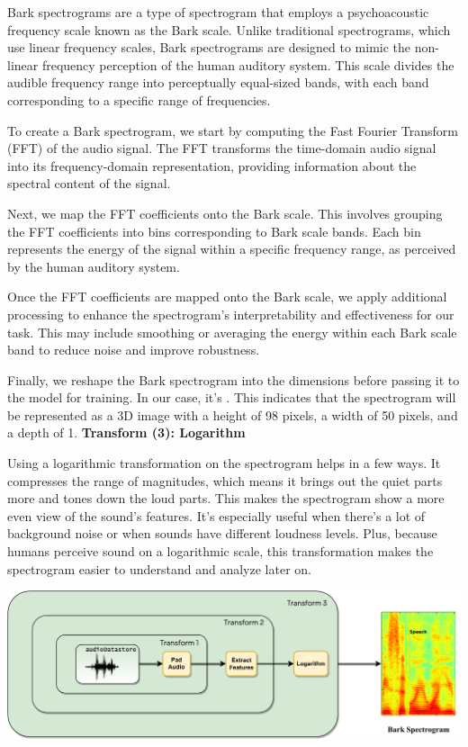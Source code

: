 \documentclass[a4paper]{report}
\begin{document}
{Bark spectrograms are a type of spectrogram that employs a psychoacoustic frequency scale known as the Bark scale. Unlike traditional spectrograms, which use linear frequency scales, Bark spectrograms are designed to mimic the non-linear frequency perception of the human auditory system. This scale divides the audible frequency range into perceptually equal-sized bands, with each band corresponding to a specific range of frequencies.

To create a Bark spectrogram, we start by computing the Fast Fourier Transform (FFT) of the audio signal. The FFT transforms the time-domain audio signal into its frequency-domain representation, providing information about the spectral content of the signal.

Next, we map the FFT coefficients onto the Bark scale. This involves grouping the FFT coefficients into bins corresponding to Bark scale bands. Each bin represents the energy of the signal within a specific frequency range, as perceived by the human auditory system.

Once the FFT coefficients are mapped onto the Bark scale, we apply additional processing to enhance the spectrogram's interpretability and effectiveness for our task. This may include smoothing or averaging the energy within each Bark scale band to reduce noise and improve robustness.

Finally, we reshape the Bark spectrogram into the dimensions before passing it to the model for training. In our case, it's . This indicates that the spectrogram will be represented as a 3D image with a height of 98 pixels, a width of 50 pixels, and a depth of 1.
\newpage
\textbf{Transform (3): Logarithm}

Using a logarithmic transformation on the spectrogram helps in a few ways. It compresses the range of magnitudes, which means it brings out the quiet parts more and tones down the loud parts. This makes the spectrogram show a more even view of the sound's features. It's especially useful when there's a lot of background noise or when sounds have different loudness levels. Plus, because humans perceive sound on a logarithmic scale, this transformation makes the spectrogram easier to understand and analyze later on.
\begin{center}
    \includegraphics[width=1.0\linewidth]{transform2.pdf}
\end{center}
}
\end{document}
